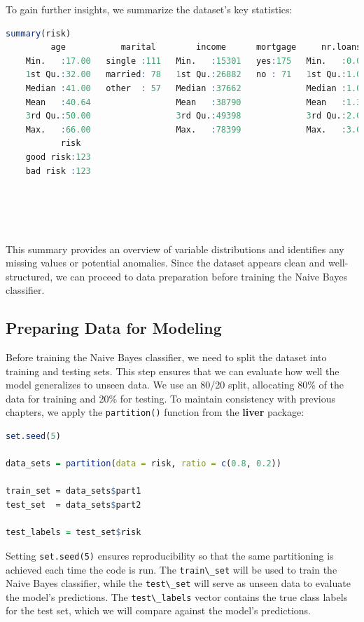 \documentclass[
  11pt,
]{book}
\newcommand{\passthrough}[1]{#1}
\theoremstyle{definition}
\theoremstyle{definition}
\theoremstyle{definition}
\theoremstyle{definition}
\theoremstyle{remark}
\begin{document}
To gain further insights, we summarize the dataset's key statistics:

\begin{lstlisting}[language=R]
summary(risk)
         age           marital        income      mortgage     nr.loans    
    Min.   :17.00   single :111   Min.   :15301   yes:175   Min.   :0.000  
    1st Qu.:32.00   married: 78   1st Qu.:26882   no : 71   1st Qu.:1.000  
    Median :41.00   other  : 57   Median :37662             Median :1.000  
    Mean   :40.64                 Mean   :38790             Mean   :1.309  
    3rd Qu.:50.00                 3rd Qu.:49398             3rd Qu.:2.000  
    Max.   :66.00                 Max.   :78399             Max.   :3.000  
           risk    
    good risk:123  
    bad risk :123  
                   
                   
                   
   
\end{lstlisting}

This summary provides an overview of variable distributions and identifies any missing values or potential anomalies. Since the dataset appears clean and well-structured, we can proceed to data preparation before training the Naive Bayes classifier.

\subsection*{Preparing Data for Modeling}\label{preparing-data-for-modeling-1}


Before training the Naive Bayes classifier, we need to split the dataset into training and testing sets. This step ensures that we can evaluate how well the model generalizes to unseen data. We use an 80/20 split, allocating 80\% of the data for training and 20\% for testing. To maintain consistency with previous chapters, we apply the \passthrough{\lstinline!partition()!} function from the \textbf{liver} package:

\begin{lstlisting}[language=R]
set.seed(5)

data_sets = partition(data = risk, ratio = c(0.8, 0.2))

train_set = data_sets$part1
test_set  = data_sets$part2

test_labels = test_set$risk
\end{lstlisting}

Setting \passthrough{\lstinline!set.seed(5)!} ensures reproducibility so that the same partitioning is achieved each time the code is run. The \passthrough{\lstinline!train\_set!} will be used to train the Naive Bayes classifier, while the \passthrough{\lstinline!test\_set!} will serve as unseen data to evaluate the model's predictions. The \passthrough{\lstinline!test\_labels!} vector contains the true class labels for the test set, which we will compare against the model's predictions.
\end{document}

